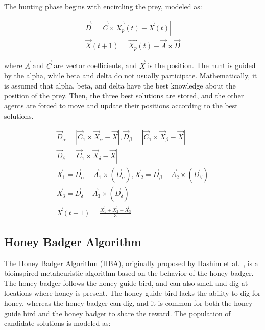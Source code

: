 \documentclass{elsarticle}
\begin{document}
\noindent The hunting phase begins with encircling the prey, modeled as:

\begin{equation}
\begin{gathered}
\vec{D} = |\vec{C} \times \vec{X_p}(t)-\vec{X}(t)|\\
\vec{X}(t+1) = \vec{X_p}(t) - \vec{A} \times \vec{D}
\end{gathered}
\label{eq25}
\end{equation}

\noindent where $\vec{A}$ and $\vec{C}$ are vector coefficients, and $\vec{X}$ is the position. The hunt is guided by the alpha, while beta and delta do not usually participate. Mathematically, it is assumed that alpha, beta, and delta have the best knowledge about the position of the prey. Then, the three best solutions are stored, and the other agents are forced to move and update their positions according to the best solutions.

\begin{equation}
\begin{gathered}
\vec{D}_{\alpha} = |\vec{C}_1 \times \vec{X}_{\alpha} -\vec{X}|, \vec{D}_{\beta} = |\vec{C}_1 \times \vec{X}_{\beta} -\vec{X}| \\
\vec{D}_{\delta} = |\vec{C}_1 \times \vec{X}_{\delta} -\vec{X}|\\
\vec{X}_1=\vec{D}_{\alpha}-\vec{A}_1 \times (\vec{D}_{\alpha}), \vec{X}_2=\vec{D}_{\beta}-\vec{A}_2 \times (\vec{D}_{\beta})\\
\vec{X}_3=\vec{D}_{\delta}-\vec{A}_3 \times (\vec{D}_{\delta}) \\
\vec{X}(t+1) = \frac{\vec{X}_1+\vec{X}_2+\vec{X}_3}{3}
\end{gathered}
\label{eq26}
\end{equation}
\subsection{Honey Badger Algorithm}

\noindent The Honey Badger Algorithm (HBA), originally proposed by Hashim et al.~\cite{Hashim2022}, is a bioinspired metaheuristic algorithm based on the behavior of the honey badger. The honey badger follows the honey guide bird, and can also smell and dig at locations where honey is present. The honey guide bird lacks the ability to dig for honey, whereas the honey badger can dig, and it is common for both the honey guide bird and the honey badger to share the reward. The population of candidate solutions is modeled as:
\end{document}
